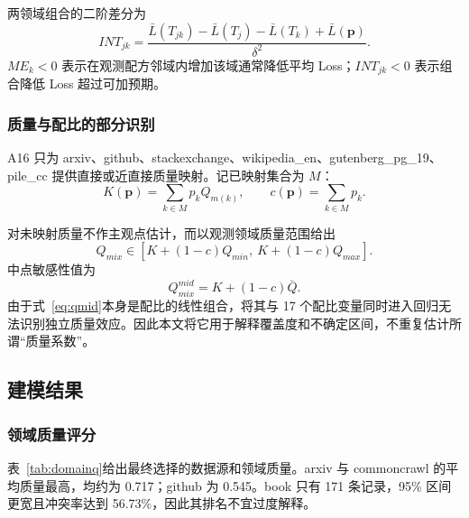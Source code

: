 \documentclass[bwprint]{gmcmthesis}
\numberwithin{equation}{section}
\numberwithin{figure}{section}
\numberwithin{table}{section}
\begin{document}
        两领域组合的二阶差分为
        \begin{equation}
        INT_{jk}=\frac{
        \bar L(T_{jk})-\bar L(T_j)-\bar L(T_k)+\bar L(\bm p)
        }{\delta^2}.
        \label{eq:interaction}
        \end{equation}
        $ME_k<0$ 表示在观测配方邻域内增加该域通常降低平均 Loss；$INT_{jk}<0$ 表示组合降低 Loss 超过可加预期。

        
        \subsubsection{质量与配比的部分识别}  %
        A16 只为 arxiv、github、stackexchange、wikipedia\_en、gutenberg\_pg\_19、pile\_cc 提供直接或近直接质量映射。记已映射集合为 $M$：
        \begin{equation}
        K(\bm p)=\sum_{k\in M}p_kQ_{m(k)},\qquad
        c(\bm p)=\sum_{k\in M}p_k.
        \label{eq:mapped}
        \end{equation}
        
        对未映射质量不作主观点估计，而以观测领域质量范围给出
        \begin{equation}
        Q_{mix}\in\left[K+(1-c)Q_{min},\ K+(1-c)Q_{max}\right].
        \label{eq:partial}
        \end{equation}
        中点敏感性值为
        \begin{equation}
        Q_{mix}^{mid}=K+(1-c)\bar Q.
        \label{eq:qmid}
        \end{equation}
        由于式~\eqref{eq:qmid}本身是配比的线性组合，将其与 17 个配比变量同时进入回归无法识别独立质量效应。因此本文将它用于解释覆盖度和不确定区间，不重复估计所谓``质量系数''。


    \subsection{建模结果}   %
        \subsubsection{领域质量评分} %
        表~\ref{tab:domainq}给出最终选择的数据源和领域质量。arxiv 与 commoncrawl 的平均质量最高，均约为 0.717；github 为 0.545。book 只有 171 条记录，95\% 区间更宽且冲突率达到 56.73\%，因此其排名不宜过度解释。
    
\end{document}

